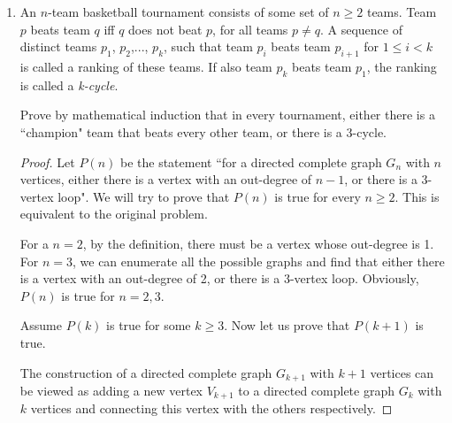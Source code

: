 \documentclass[12pt,a4paper]{article}
\theoremstyle{definition}
\begin{document}
\begin{enumerate}
\begin{proof}
        Assume for $k\ge 2$ and $2\le n \le k$,$P(n)$ is true. Now let us prove that $P(k+1)$ is true.
        
        By definition, we have
        \begin{align*}
            f(k+1) &= 5f(k)-6f(k-1) \\
              &= 5\times (3^{k}-2^{k})-6\times (3^{k-1}-2^{k-1})\\
              &= 5\times 3^{k}-5\times 2^{k} -2\times 3^{k} + 3\times2^{k}\\
              &= 3^{k+1}-2^{k+1}
        \end{align*}
        Therefore, $P(k+1)$ is true.
        
        According to the strong principle of mathematical induction, for every $n\in N$, $P(n)$ is true, and $f(n)=3^n-2^n$.
    \end{proof}

    \item
    An $n$-team basketball tournament consists of some set of $n\geq2$ teams. Team $p$ beats team $q$ iff $q$
does not beat $p$, for all teams $p\neq q$. A sequence of distinct teams $p_{1}$, $p_{2}$,..., $p_{k}$, such that team $p_{i}$ beats team $p_{i+1}$ for $1\leq i<k$ is called a ranking of these teams. If also team $p_{k}$ beats team $p_{1}$, the ranking is called a \emph{k-cycle}. 

Prove by mathematical induction that in every tournament, either there is a ``champion" team that beats every other team, or there is a 3-cycle. 
    \begin{proof}
        Let $P(n)$ be the statement ``for a directed complete graph $G_{n}$ with $n$ vertices, either there is a vertex with an out-degree of $n-1$, or there is a 3-vertex loop". We will try to prove that $P(n)$ is true for every $n\ge 2$. This is equivalent to the original problem.
        
        For a $n=2$, by the definition, there must be a vertex whose out-degree is 1. For $n=3$, we can enumerate all the possible graphs and find that either there is a vertex with an out-degree of 2, or there is a 3-vertex loop. Obviously, $P(n)$ is true for $n=2,3$.
        
        Assume $P(k)$ is true for some $k\ge 3$. Now let us prove that $P(k+1)$ is true.
        
        The construction of a directed complete graph $G_{k+1}$ with $k+1$ vertices can be viewed as adding a new vertex $V_{k+1}$ to a directed complete graph $G_{k}$ with $k$ vertices and connecting this vertex with the others respectively.
        

\end{proof}
\end{enumerate}
\end{document}
